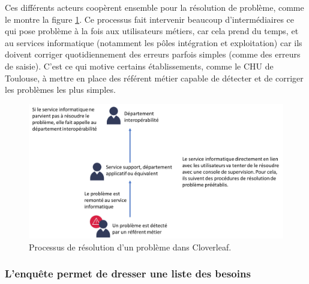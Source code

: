 			Ces différents acteurs coopèrent ensemble pour la résolution de problème,
			comme le montre la figure \ref{resolution_pbs}. Ce processus fait intervenir
			beaucoup d’intermédiaires ce qui pose problème à la fois aux utilisateurs métiers,
			car cela prend du temps, et au services informatique
			(notamment les pôles intégration et exploitation) car ils doivent corriger
			quotidiennement des erreurs parfois simples (comme des erreurs de saisie).
			C'est ce qui motive certains établissements, comme le CHU de
			Toulouse, à mettre en place des référent métier capable de détecter et
			de corriger les problèmes les plus simples.
			\begin{figure}[H]
				\centering
				\includegraphics[width=15cm]{../img/user_1.png}
				\caption{\label{resolution_pbs} Processus de résolution d'un problème dans
				Cloverleaf.}
			\end{figure}
			
		\subsubsection{L'enquête permet de dresser une liste des besoins}
